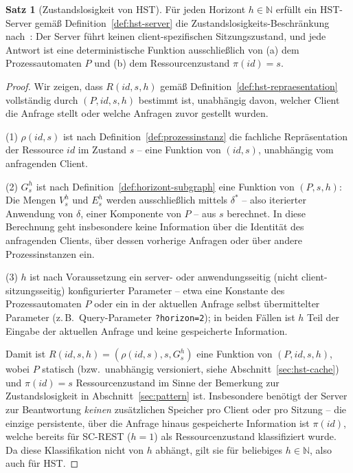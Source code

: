 ﻿\documentclass[a4paper,12pt]{article}
\theoremstyle{definition}
\newtheorem{satz}{Satz}
\begin{document}
\begin{satz}[Zustandslosigkeit von HST]
	\label{satz:hst-zustandslosigkeit}
	Für jeden Horizont $h\in\mathbb{N}$ erfüllt ein HST-Server gemäß
	Definition~\ref{def:hst-server} die Zustandslosigkeits-Beschränkung
	nach~\cite{fielding2000}: Der Server führt keinen client-spezifischen
	Sitzungszustand, und jede Antwort ist eine deterministische Funktion ausschließlich
	von (a) dem Prozessautomaten $P$ und (b) dem Ressourcenzustand $\pi(id)=s$.
\end{satz}

\begin{proof}
	Wir zeigen, dass $R(id,s,h)$ gemäß Definition~\ref{def:hst-repraesentation}
	vollständig durch $(P,id,s,h)$ bestimmt ist, unabhängig davon, welcher Client die
	Anfrage stellt oder welche Anfragen zuvor gestellt wurden.

	(1) $\rho(id,s)$ ist nach Definition~\ref{def:prozessinstanz} die fachliche
	Repräsentation der Ressource $id$ im Zustand $s$ -- eine Funktion von $(id,s)$,
	unabhängig vom anfragenden Client.

	(2) $G_s^h$ ist nach Definition~\ref{def:horizont-subgraph} eine Funktion von
	$(P,s,h)$: Die Mengen $V_s^h$ und $E_s^h$ werden ausschließlich mittels
	$\delta^{*}$ -- also iterierter Anwendung von $\delta$, einer Komponente von $P$ --
	aus $s$ berechnet. In diese Berechnung geht insbesondere keine Information über die
	Identität des anfragenden Clients, über dessen vorherige Anfragen oder über andere
	Prozessinstanzen ein.

	(3) $h$ ist nach Voraussetzung ein server- oder anwendungsseitig (nicht
	client-sitzungsseitig) konfigurierter Parameter -- etwa eine Konstante des
	Prozessautomaten $P$ oder ein in der aktuellen Anfrage selbst übermittelter Parameter
	(z.\,B.\ Query-Parameter \texttt{?horizon=2}); in beiden Fällen ist $h$ Teil der
	Eingabe der aktuellen Anfrage und keine gespeicherte Information.

	Damit ist $R(id,s,h)=(\rho(id,s),s,G_s^h)$ eine Funktion von $(P,id,s,h)$, wobei $P$
	statisch (bzw.\ unabhängig versioniert, siehe Abschnitt~\ref{sec:hst-cache}) und
	$\pi(id)=s$ Ressourcenzustand im Sinne der Bemerkung zur Zustandslosigkeit in
	Abschnitt~\ref{sec:pattern} ist. Insbesondere benötigt der Server zur Beantwortung
	\emph{keinen} zusätzlichen Speicher pro Client oder pro Sitzung -- die einzige
	persistente, über die Anfrage hinaus gespeicherte Information ist $\pi(id)$, welche
	bereits für SC-REST ($h=1$) als Ressourcenzustand klassifiziert wurde. Da diese
	Klassifikation nicht von $h$ abhängt, gilt sie für beliebiges $h\in\mathbb{N}$, also
	auch für HST. \qedhere
\end{proof}
\end{document}
